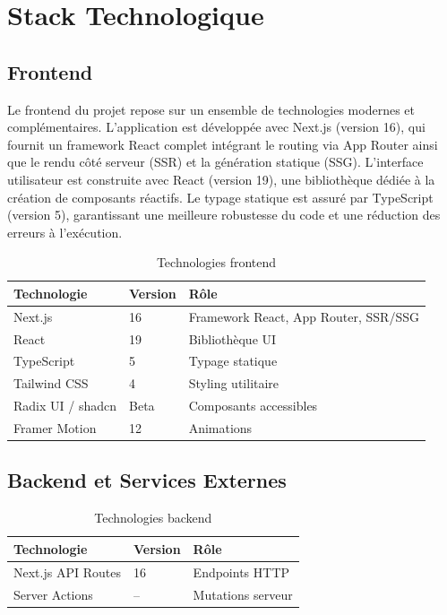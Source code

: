 \documentclass[12pt, a4paper, twoside]{report}
\begin{document}
\section{Stack Technologique}
\subsection{Frontend}

Le frontend du projet repose sur un ensemble de technologies modernes et complémentaires. L'application est développée avec Next.js (version 16), qui fournit un framework React complet intégrant le routing via App Router ainsi que le rendu côté serveur (SSR) et la génération statique (SSG). L'interface utilisateur est construite avec React (version 19), une bibliothèque dédiée à la création de composants réactifs. Le typage statique est assuré par TypeScript (version 5), garantissant une meilleure robustesse du code et une réduction des erreurs à l'exécution.



\begin{table}[H]
 
  \begin{tabularx}{\textwidth}{|l|l|X|}
    \hline
    \textbf{Technologie} & \textbf{Version} & \textbf{Rôle} \\
    \hline
    Next.js            & 16   & Framework React, App Router, SSR/SSG \\
    React              & 19   & Bibliothèque UI \\
    TypeScript         & 5   & Typage statique \\
    Tailwind CSS       &  4 & Styling utilitaire \\
    Radix UI / shadcn  & Beta      & Composants accessibles \\
    Framer Motion      & 12    & Animations \\
    \hline
  \end{tabularx} 
  \caption{Technologies frontend}
  \label{tab:frontend}
\end{table}
\newpage
\subsection{Backend et Services Externes}

\begin{table}[H]

  \begin{tabularx}{\textwidth}{|l|l|X|}
    \hline
    \textbf{Technologie} & \textbf{Version} & \textbf{Rôle} \\
    \hline
    Next.js API Routes    & 16   & Endpoints HTTP \\
    Server Actions        & --       & Mutations serveur \\
    \hline
  \end{tabularx}
  \caption{Technologies backend}
  \label{tab:backend}
\end{table}
\end{document}
